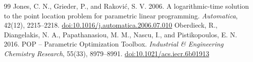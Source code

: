 \begin{thebibliography}{99}
 Jones, C. N., Grieder, P., and Rakovi{\'c}, S. V. 2006. A logarithmic-time solution to the point location problem for parametric linear programming. \emph{Automatica}, 42(12), 2215--2218. \href{https://login.ezproxy.lib.purdue.edu/login?url=https://doi.org/10.1016/j.automatica.2006.07.010}{doi:10.1016/j.automatica.2006.07.010}
 Oberdieck, R., Diangelakis, N. A., Papathanasiou, M. M., Nascu, I., and Pistikopoulos, E. N. 2016. {POP} -- Parametric Optimization Toolbox. \emph{Industrial \& Engineering Chemistry Research}, 55(33), 8979--8991. \href{https://login.ezproxy.lib.purdue.edu/login?url=https://doi.org/10.1021/acs.iecr.6b01913}{doi:10.1021/acs.iecr.6b01913}
\end{thebibliography}
